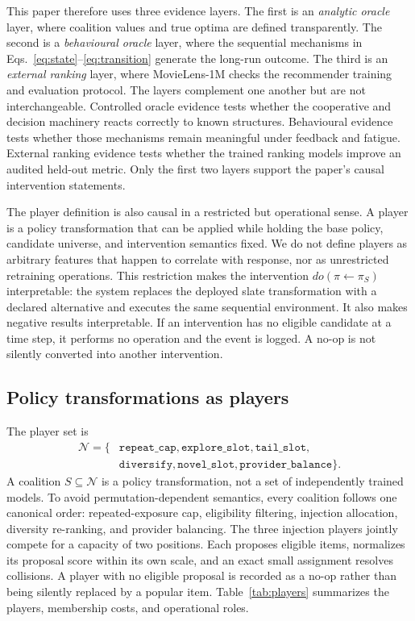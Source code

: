 \documentclass[review]{elsarticle}
\theoremstyle{plain}
\theoremstyle{definition}
\theoremstyle{remark}
\newcommand{\Players}{\mathcal{N}}
\newcommand{\Policy}{\pi}
\begin{document}
This paper therefore uses three evidence layers. The first is an \emph{analytic oracle} layer, where coalition values and true optima are defined transparently. The second is a \emph{behavioural oracle} layer, where the sequential mechanisms in Eqs.~\eqref{eq:state}--\eqref{eq:transition} generate the long-run outcome. The third is an \emph{external ranking} layer, where MovieLens-1M checks the recommender training and evaluation protocol. The layers complement one another but are not interchangeable. Controlled oracle evidence tests whether the cooperative and decision machinery reacts correctly to known structures. Behavioural evidence tests whether those mechanisms remain meaningful under feedback and fatigue. External ranking evidence tests whether the trained ranking models improve an audited held-out metric. Only the first two layers support the paper's causal intervention statements.

The player definition is also causal in a restricted but operational sense. A player is a policy transformation that can be applied while holding the base policy, candidate universe, and intervention semantics fixed. We do not define players as arbitrary features that happen to correlate with response, nor as unrestricted retraining operations. This restriction makes the intervention $do(\Policy\leftarrow\Policy_S)$ interpretable: the system replaces the deployed slate transformation with a declared alternative and executes the same sequential environment. It also makes negative results interpretable. If an intervention has no eligible candidate at a time step, it performs no operation and the event is logged. A no-op is not silently converted into another intervention.

\subsection{Policy transformations as players}

The player set is
\begin{equation}
 \begin{aligned}
 \Players=\{&\texttt{repeat\_cap},\texttt{explore\_slot},\texttt{tail\_slot},\\
              &\texttt{diversify},\texttt{novel\_slot},\texttt{provider\_balance}\}.
 \end{aligned}
\label{eq:players}
\end{equation}
A coalition $S\subseteq\Players$ is a policy transformation, not a set of independently trained models. To avoid permutation-dependent semantics, every coalition follows one canonical order: repeated-exposure cap, eligibility filtering, injection allocation, diversity re-ranking, and provider balancing. The three injection players jointly compete for a capacity of two positions. Each proposes eligible items, normalizes its proposal score within its own scale, and an exact small assignment resolves collisions. A player with no eligible proposal is recorded as a no-op rather than being silently replaced by a popular item. Table~\ref{tab:players} summarizes the players, membership costs, and operational roles.
\end{document}
